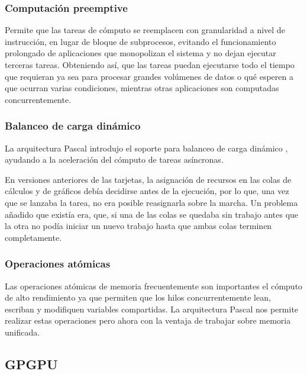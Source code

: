      
    \subsubsection{Computación preemptive}
    Permite que las tareas de cómputo se reemplacen con granularidad a nivel de instrucción, en lugar de bloque de subprocesos, evitando el funcionamiento prolongado de aplicaciones que monopolizan el sistema y no dejan ejecutar terceras tareas\cite{WPNV}. Obteniendo así, que las tareas puedan ejecutarse todo el tiempo que requieran ya sea para procesar grandes volúmenes de datos o qué esperen a que ocurran varias condiciones, mientras otras aplicaciones son computadas concurrentemente.

    \subsubsection{Balanceo de carga dinámico}
        La arquitectura Pascal introdujo el soporte para balanceo de carga dinámico \cite{AnPasc},  ayudando a la aceleración del cómputo de tareas asíncronas.
        
        \vspace{0.3cm}
    En versiones anteriores de las tarjetas, la asignación de recursos en las colas de cálculos y de gráficos debía decidirse antes de la ejecución, por lo que, una vez que se lanzaba la tarea, no era posible reasignarla sobre la marcha. Un problema añadido que existía era, que, si una de las colas se quedaba sin trabajo antes que la otra no podía iniciar un nuevo trabajo hasta que ambas colas terminen completamente\cite{PasAna}.
    
    \subsubsection{Operaciones atómicas} 
    Las operaciones atómicas de memoria frecuentemente son importantes el cómputo de alto rendimiento ya que permiten que los hilos concurrentemente lean, escriban y modifiquen variables compartidas. La arquitectura Pascal nos permite realizar estas operaciones pero ahora con la ventaja de trabajar sobre memoria unificada.

    \subsection{GPGPU}
    
